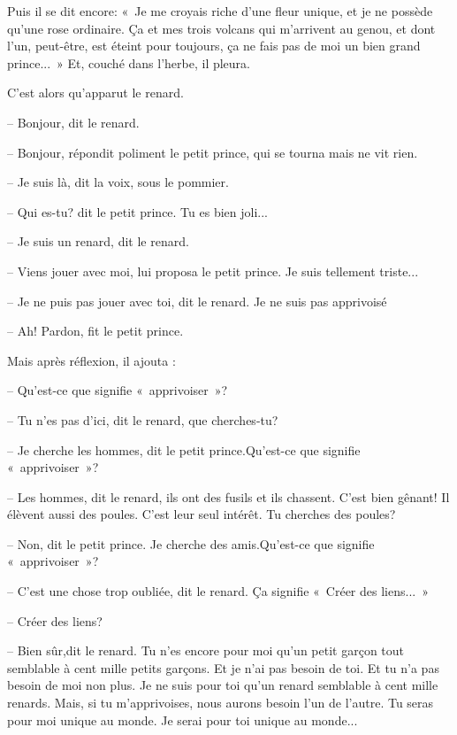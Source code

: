 \documentclass[a4paper]{report}
\begin{document}
Puis il se dit encore: «~Je me croyais riche d'une fleur unique, et je ne possède qu'une rose ordinaire. Ça et mes trois volcans qui m'arrivent au genou, et dont l'un, peut-être, est éteint pour toujours, ça ne fais pas de moi un bien grand prince...~» Et, couché dans l'herbe, il pleura. 


\parachapter{} %
C'est alors qu'apparut le renard.

-- Bonjour, dit le renard.

-- Bonjour, répondit poliment le petit prince, qui se tourna mais ne vit rien.

-- Je suis là, dit la voix, sous le pommier.

-- Qui es-tu? dit le petit prince. Tu es bien joli...


-- Je suis un renard, dit le renard.

-- Viens jouer avec moi, lui proposa le petit prince. Je suis tellement triste...

-- Je ne puis pas jouer avec toi, dit le renard. Je ne suis pas apprivoisé

-- Ah! Pardon, fit le petit prince.

Mais après réflexion, il ajouta :

-- Qu'est-ce que signifie «~apprivoiser~»?

-- Tu n'es pas d'ici, dit le renard, que cherches-tu?

-- Je cherche les hommes, dit le petit prince.Qu'est-ce que signifie «~apprivoiser~»?

-- Les hommes, dit le renard, ils ont des fusils et ils chassent. C'est bien gênant! Il élèvent aussi des poules. C'est leur seul intérêt. Tu cherches des poules?

-- Non, dit le petit prince. Je cherche des amis.Qu'est-ce que signifie «~apprivoiser~»?

-- C'est une chose trop oubliée, dit le renard. Ça signifie «~Créer des liens...~»

-- Créer des liens?

-- Bien sûr,dit le renard. Tu n'es encore pour moi qu'un petit garçon tout semblable à cent mille petits garçons. Et je n'ai pas besoin de toi. Et tu n'a pas besoin de moi non plus. Je ne suis pour toi qu'un renard semblable à cent mille renards. Mais, si tu m'apprivoises, nous aurons besoin l'un de l'autre. Tu seras pour moi unique au monde. Je serai pour toi unique au monde...
\end{document}
